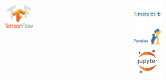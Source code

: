 \documentclass[12pt, aspectratio=169]{beamer}
\begin{document}
{{\begin{columns}
\begin{column}{4cm}
\begin{figure}
      \vspace{1em}
      \hspace{-4em}
   \includegraphics[width=0.38\textwidth]{tensorflow} 
   \end{figure}
   \end{column}
    \begin{column}{4cm}
   \begin{figure}
      \includegraphics[width=0.38\textwidth]{matplot}  \\ 
      \vspace{1em}
      \includegraphics[width=0.38\textwidth]{pandas}  \\ 
      \vspace{1em}
      \includegraphics[width=0.38\textwidth]{jupyter} 
   \end{figure}
   \end{column}
   \end{columns}
 }
}
\end{document}
